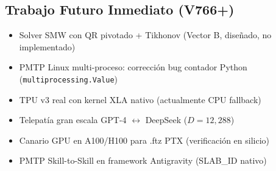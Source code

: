 \subsection{Trabajo Futuro Inmediato (V766+)}

\begin{itemize}
  \item Solver SMW con QR pivotado + Tikhonov (Vector B, diseñado, no implementado)
  \item PMTP Linux multi-proceso: corrección bug contador Python (\texttt{multiprocessing.Value})
  \item TPU v3 real con kernel XLA nativo (actualmente CPU fallback)
  \item Telepatía gran escala GPT-4 $\leftrightarrow$ DeepSeek ($D = 12{,}288$)
  \item Canario GPU en A100/H100 para .ftz PTX (verificación en silicio)
  \item PMTP Skill-to-Skill en framework Antigravity (SLAB\_ID nativo)
\end{itemize}
